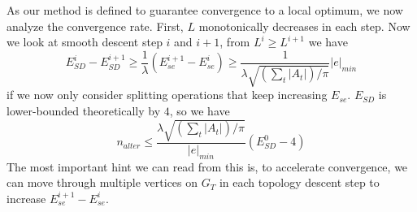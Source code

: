 
As our method is defined to guarantee convergence to a local optimum, we now analyze the convergence rate. First, $L$ monotonically decreases in each step. Now we look at smooth descent step $i$ and $i+1$, from $L^i \geq L^{i+1}$ we have
\[ E^i_{SD} - E^{i+1}_{SD} \geq \frac{1}{\lambda} (E^{i+1}_{se} - E^i_{se}) \geq \frac{1}{\lambda\sqrt{(\sum_t |A_t|)/\pi}} |e|_{min} \]
if we now only consider splitting operations that keep increasing $E_{se}$. $E_{SD}$ is lower-bounded theoretically by $4$, so we have
\[ n_{alter} \leq \frac{\lambda\sqrt{(\sum_t |A_t|)/\pi}}{|e|_{min}} (E^0_{SD} - 4) \]
The most important hint we can read from this is, to accelerate convergence, we can move through multiple vertices on $G_T$ in each topology descent step to increase $E^{i+1}_{se} - E^i_{se}$.

 